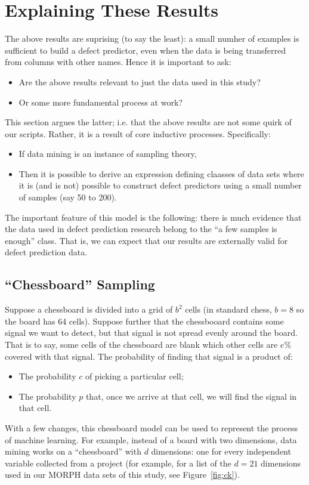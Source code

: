 



\newcommand{\fig}[1]{Figure~\ref{fig:#1}}
\newcommand{\eq}[1]{Equation~\ref{eq:#1}}
\newcommand{\bi}{\begin{itemize}}
\newcommand{\ei}{\end{itemize}}

\section{Explaining These Results}

The above results are suprising (to say the least): a small numher
of examples is sufficient to build a defect predictor, even when the data is being transferred from columns with other names.
Hence it is important to ask:
\bi
\item Are the above results relevant to just the data used in this study?
\item Or some more fundamental process at work?
\ei
This section argues the latter; i.e. that the above results are not some quirk of our scripts. Rather, it is a result
of core inductive processes.
Specifically:
\bi
\item
If data mining is an instance of sampling theory,
\item Then it is possible to derive
an expression defining claasses of data sets where it is (and is not) possible to  construct
defect predictors using a small number of samples (say 50 to 200).
\ei
The important feature of this model is the
following: there is much evidence that the data used
in defect prediction research belong to the ``a few
samples is enough'' class.  That is, we can expect that our
results are externally valid for defect prediction data.

\subsection{``Chessboard'' Sampling}

Suppose a chessboard is divided into a grid of $b^2$ cells (in standard chess, $b=8$ so the board has 64 cells). Suppose further that the chessbooard
contains some signal we want to detect, but that signal is not spread evenly around the board.
That is to say, some cells of the chessboard are blank which other cells are $e$\% covered
with that signal. The probability of finding that signal is a product of:
\bi
\item The probability $c$ of picking a particular cell;
\item The probability $p$ that, once we arrive at that cell, we will find  the  signal in that cell.
\ei
With a few changes, this chessboard model can be
used to represent the process of machine
learning. For example,
instead of a board with two
dimensions, data mining works on a ``chessboard''
with $d$ dimensions: one for every independent
variable collected from a project (for example, for a list of the
$d=21$ dimensions used in our MORPH data sets of this study,
see \fig{ck}).

